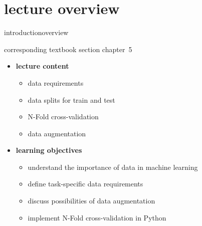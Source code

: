 


\subtitle{module 5.0: data, data splits, and augmentation}


	

    \section[overview]{lecture overview}
        \begin{frame}{introduction}{overview}
            \begin{block}{corresponding textbook section}
                    chapter~5
            \end{block}

            \begin{itemize}
                \item   \textbf{lecture content}
                    \begin{itemize}
                        \item   data requirements
                        \item   data splits for train and test
                        \item   N-Fold cross-validation
                        \item   data augmentation
                    \end{itemize}
                \bigskip
                \item<2->   \textbf{learning objectives}
                    \begin{itemize}
                        \item   understand the importance of data in machine learning 
                        \item   define task-specific data requirements
                        \item   discuss possibilities of data augmentation
                        \item   implement N-Fold cross-validation in Python
                    \end{itemize}
            \end{itemize}
        \end{frame}

